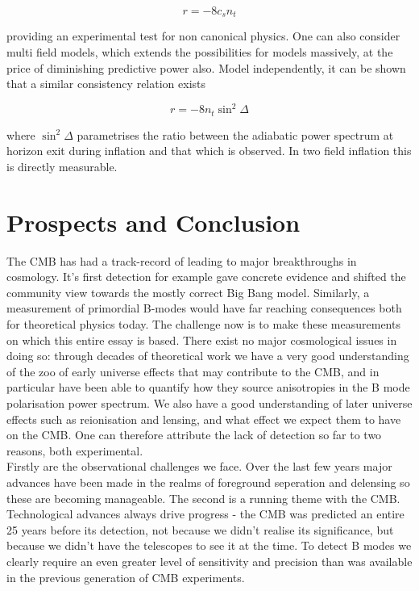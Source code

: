 \documentclass[a4paper,10pt]{article}
\begin{document}
\begin{equation}
r=-8c_sn_t
\end{equation}

providing an experimental test for non canonical physics. One can also consider multi field models, which extends the possibilities for models massively, at the price of diminishing predictive power also. Model independently, it can be shown that a similar consistency relation exists

\begin{equation}
r=-8n_t\sin^2\Delta
\end{equation}

where $\sin^2\Delta$ parametrises the ratio between the adiabatic power spectrum at horizon exit during inflation and that which is observed. In two field inflation this is directly measurable. 


\section{Prospects and Conclusion}

The CMB has had a track-record of leading to major breakthroughs in cosmology. It's first detection for example gave concrete evidence and shifted the community view towards the mostly correct Big Bang model. Similarly, a measurement of primordial B-modes would have far reaching consequences both for theoretical physics today. The challenge now is to make these measurements on which this entire essay is based. There exist no major cosmological issues in doing so: through decades of theoretical work we have a very good understanding of the zoo of early universe effects that may contribute to the CMB, and in particular have been able to quantify how they source anisotropies in the B mode polarisation power spectrum. We also have a good understanding of later universe effects such as reionisation and lensing, and what effect we expect them to have on the CMB. One can therefore attribute the lack of detection so far to two reasons, both experimental.\\

Firstly are the observational challenges we face. Over the last few years major advances have been made in the realms of foreground seperation and delensing so these are becoming manageable. The second is a running theme with the CMB. Technological advances always drive progress - the CMB was predicted an entire 25 years before its detection, not because we didn't realise its significance, but because we didn't have the telescopes to see it at the time. To detect B modes we clearly require an even greater level of sensitivity and precision than was available in the previous generation of CMB experiments. \\
\end{document}
